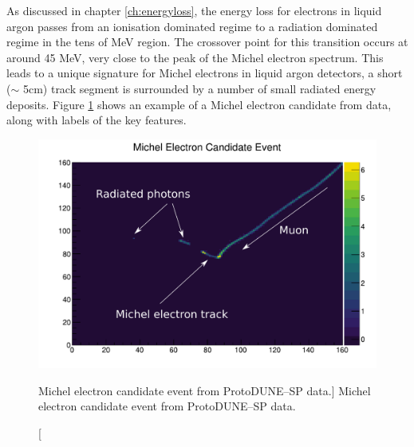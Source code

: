 
As discussed in chapter \ref{ch:energyloss}, the energy loss for electrons in
liquid argon passes from an ionisation dominated regime to a radiation dominated
regime in the tens of MeV region. The crossover point for this transition occurs
at around 45 MeV, very close to the peak of the Michel electron spectrum. This
leads to a unique signature for Michel electrons in liquid argon detectors, a
short ($\sim$ 5cm) track segment is surrounded by a number of small radiated 
energy deposits. Figure \ref{fig:michel_event} shows an example of a Michel 
electron candidate from \protodune{} data, along with labels of the key 
features.

\begin{figure}
	\centering
	\includegraphics[width=\textwidth]{figures/michel_candidate_labelled.pdf}
	\caption
	[Michel electron candidate event from ProtoDUNE--SP data.]
	{Michel electron candidate event from ProtoDUNE--SP data.}
	\label{fig:michel_event}
\end{figure}

